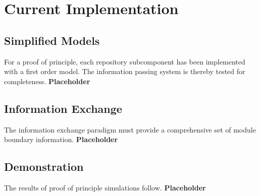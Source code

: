 \chapter{Current Implementation}\label{ch:current}
\section{Simplified Models}
For a proof of principle, each repository subcomponent has been 
implemented with a first order model. The information passing system 
is thereby tested for completeness. 
\textbf{Placeholder} 
\section{Information Exchange}
The information exchange paradigm must provide a comprehensive set of 
module boundary information.
\textbf{Placeholder} 
\section{Demonstration}
The results of proof of principle simulations follow.
\textbf{Placeholder} 

